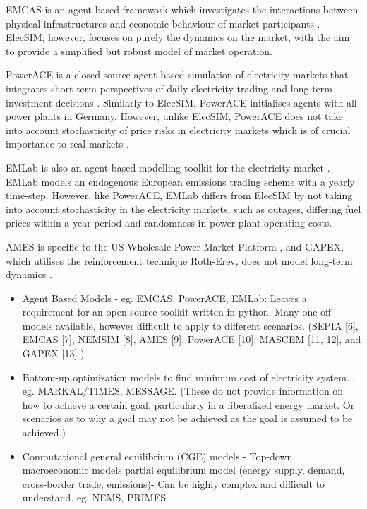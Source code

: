 EMCAS is an agent-based framework which investigates the interactions between physical infrastructures and economic behaviour of market participants \cite{Conzelmann}. ElecSIM, however, focuses on purely the dynamics on the market, with the aim to provide a simplified but robust model of market operation. 

PowerACE is a closed source agent-based simulation of electricity markets that integrates short-term perspectives of daily electricity trading and long-term investment decisions \cite{Rothengatter2007}. Similarly to ElecSIM, PowerACE initialises agents with all power plants in Germany. However, unlike ElecSIM, PowerACE does not take into account stochasticity of price risks in electricity markets which is of crucial importance to real markets \cite{Most2010}.

EMLab is also an agent-based modelling toolkit for the electricity market \cite{Chappin2017}. EMLab models an endogenous European emissions trading scheme with a yearly time-step. However, like PowerACE, EMLab differs from ElecSIM by not taking into account stochasticity in the electricity markets, such as outages, differing fuel prices within a year period and randomness in power plant operating costs.

AMES is specific to the US Wholesale Power Market Platform \cite{Sun2007}, and GAPEX, which utilises the reinforcement technique Roth-Erev, does not model long-term dynamics \cite{Cincotti2013}.

\begin{itemize}
	\item Agent Based Models - eg. EMCAS, PowerACE, EMLab: Leaves a requirement for an open source toolkit written in python. Many one-off models available, however difficult to apply to different scenarios.
	(SEPIA [6], EMCAS [7], NEMSIM [8], AMES [9], PowerACE [10], MASCEM [11, 12], and GAPEX [13] \cite{Lopes})
	\item Bottom-up optimization models to find minimum cost of electricity system. \cite{Pfenninger2014}. eg. MARKAL/TIMES, MESSAGE. (These do not provide information on how to achieve a certain goal, particularly in a liberalized energy market. Or scenarios as to why a goal may not be achieved as the goal is assumed to be achieved.)
	\item Computational general equilibrium (CGE) models - Top-down macroeconomic models partial equilibrium model (energy supply, demand, cross-border trade, emissions)- Can be highly complex and difficult to understand. eg. NEMS, PRIMES.
\end{itemize}



